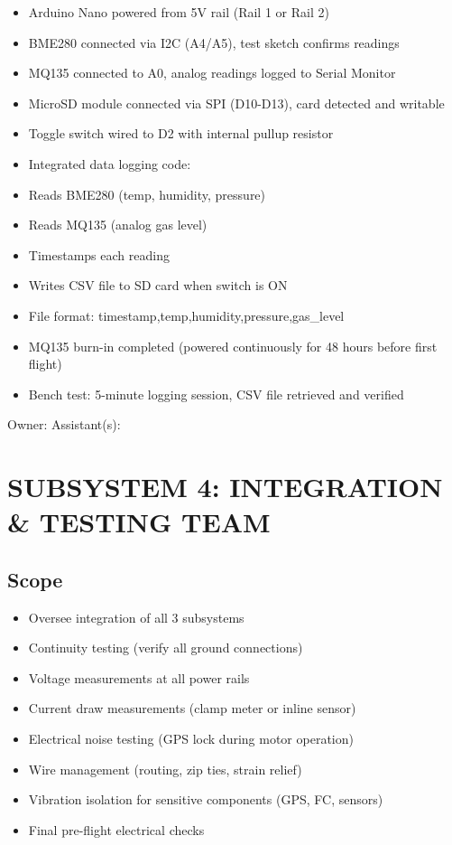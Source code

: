 \documentclass[11pt,letterpaper]{article}
\begin{document}
{\begin{itemize}
  \item Arduino Nano powered from 5V rail (Rail 1 or Rail 2)
  \item BME280 connected via I2C (A4/A5), test sketch confirms readings
  \item MQ135 connected to A0, analog readings logged to Serial Monitor
  \item MicroSD module connected via SPI (D10-D13), card detected and writable
  \item Toggle switch wired to D2 with internal pullup resistor
  \item Integrated data logging code:
  \item Reads BME280 (temp, humidity, pressure)
  \item Reads MQ135 (analog gas level)
  \item Timestamps each reading
  \item Writes CSV file to SD card when switch is ON
  \item File format: timestamp,temp,humidity,pressure,gas\_level
  \item MQ135 burn-in completed (powered continuously for 48 hours before first flight)
  \item Bench test: 5-minute logging session, CSV file retrieved and verified
\end{itemize}

Owner: \underline{\hspace{4.05cm}}  Assistant(s): \underline{\hspace{4.6499999999999995cm}}\par

\section{SUBSYSTEM 4: INTEGRATION \& TESTING TEAM}

\subsection{Scope}

\begin{itemize}
  \item Oversee integration of all 3 subsystems
  \item Continuity testing (verify all ground connections)
  \item Voltage measurements at all power rails
  \item Current draw measurements (clamp meter or inline sensor)
  \item Electrical noise testing (GPS lock during motor operation)
  \item Wire management (routing, zip ties, strain relief)
  \item Vibration isolation for sensitive components (GPS, FC, sensors)
  \item Final pre-flight electrical checks
\end{itemize}

}
\end{document}
